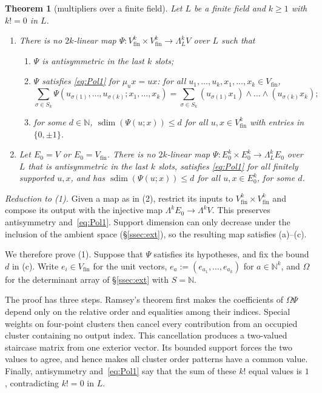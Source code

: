 \documentclass[11pt]{amsart}
\newtheorem{theorem}{Theorem}[section]
\theoremstyle{definition}
\theoremstyle{remark}
\numberwithin{equation}{section}
\newcommand{\N}{\mathbb N}
\newcommand{\sdim}{\operatorname{sdim}}
\theoremstyle{plain}
\theoremstyle{definition}
\theoremstyle{plain}
\begin{document}
\begin{samepage}
\begin{theorem}[multipliers over a finite field]\label{thm:FF}
Let $L$ be a finite field and $k\ge1$ with $k!=0$ in $L$.
\begin{enumerate}
\item There is no $2k$\nobreakdash-linear map $\Psi\colon V_{\mathrm{fin}}^k\times V_{\mathrm{fin}}^k\to\Lambda^k_LV$ over $L$ such that
\begin{enumerate}
\item $\Psi$ is antisymmetric in the last $k$ slots;
\item $\Psi$ satisfies \eqref{eq:Pol1} for $\mu_ux=ux$: for all $u_1,\dots,u_k,x_1,\dots,x_k\in V_{\mathrm{fin}}$,
\[
\sum_{\sigma\in S_k}\Psi(u_{\sigma(1)},\dots,u_{\sigma(k)};x_1,\dots,x_k)=\sum_{\sigma\in S_k}(u_{\sigma(1)}x_1)\wedge\dots\wedge(u_{\sigma(k)}x_k);
\]
\item for some $d\in\N$, $\sdim(\Psi(u;x))\le d$ for all $u,x\in V_{\mathrm{fin}}^k$ with entries in $\{0,\pm1\}$.
\end{enumerate}
\item Let $E_0=V$ or $E_0=V_{\mathrm{fin}}$. There is no $2k$\nobreakdash-linear map $\Psi\colon E_0^k\times E_0^k\to\Lambda^k_LE_0$ over $L$
that is antisymmetric in the last $k$ slots, satisfies \eqref{eq:Pol1} for all finitely supported $u,x$, and has
$\sdim(\Psi(u;x))\le d$ for all $u,x\in E_0^k$, for some $d$.
\end{enumerate}
\end{theorem}
\end{samepage}

\emph{Reduction to (1).} Given a map as in (2), restrict its inputs to
$V_{\mathrm{fin}}^k\times V_{\mathrm{fin}}^k$ and compose its output with the injective map
$\Lambda^kE_0\to\Lambda^kV$. This preserves antisymmetry and~\eqref{eq:Pol1}. Support dimension can only decrease under
the inclusion of the ambient space (\S\ref{ssec:ext}), so the resulting map satisfies (a)--(c).

We therefore prove (1). Suppose that $\Psi$ satisfies its hypotheses, and fix the bound $d$ in (c). Write
$e_i\in V_{\mathrm{fin}}$ for the unit vectors, $e_a:=(e_{a_1},\dots,e_{a_k})$ for $a\in\N^k$, and $\Omega$ for the
determinant array of \S\ref{ssec:ext} with $S=\N$.

The proof has three steps. Ramsey's theorem first makes the coefficients of $\Omega\Psi$ depend only on the relative
order and equalities among their indices. Special weights on four-point clusters then cancel every contribution
from an occupied cluster containing no output index. This cancellation produces a two-valued staircase matrix from
one exterior vector. Its bounded support forces the two values to agree, and hence makes all cluster order patterns
have a common value. Finally, antisymmetry and~\eqref{eq:Pol1} say that the sum of these $k!$ equal values is $1$,
contradicting $k!=0$ in $L$.
\end{document}
